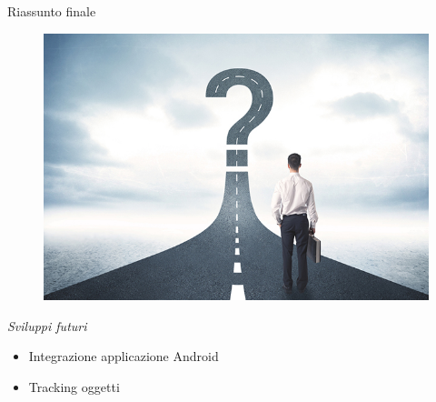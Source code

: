 \begin{frame}{Riassunto finale}
\begin{minipage}{0.3\textwidth}
\begin{figure}
				\end{figure}
			\end{minipage}
			\begin{minipage}{0.3\textwidth}
				\begin{figure}
					\includegraphics[width=1.0\textwidth]{capitolo_4/immagini/futuro}
				\end{figure}
			\end{minipage}
			\begin{minipage}{0.6\textwidth}
				\emph{Sviluppi futuri}
				\begin{itemize}
					\item Integrazione applicazione Android
					\item Tracking oggetti
				\end{itemize}
			\end{minipage}
		\end{frame}
